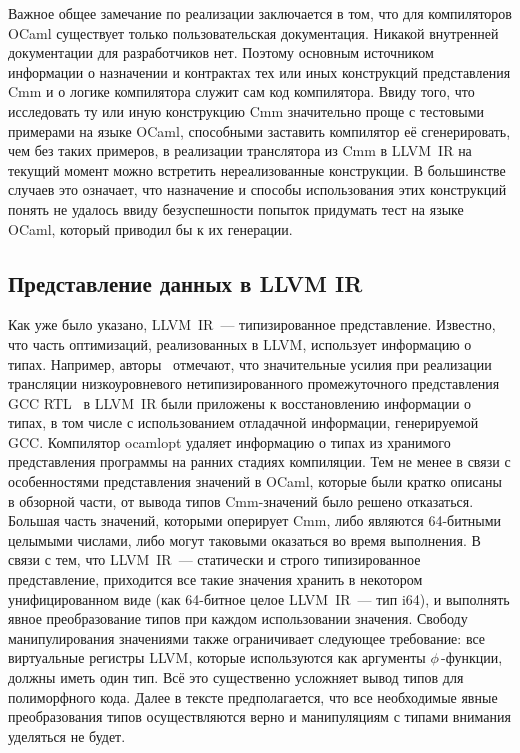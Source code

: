 \documentclass[a4paper, 12pt]{article}
\begin{document}
Важное общее замечание по реализации заключается в том, что для компиляторов OCaml существует только пользовательская
документация. Никакой внутренней документации для разработчиков нет. Поэтому основным источником информации о
назначении и контрактах тех или иных конструкций представления Cmm и о логике компилятора служит сам код компилятора.
Ввиду того, что исследовать ту или иную конструкцию Cmm значительно проще с тестовыми примерами на языке OCaml,
способными заставить компилятор её сгенерировать, чем без таких примеров, в реализации транслятора из Cmm
в LLVM~IR на текущий момент можно встретить нереализованные конструкции. В большинстве случаев это означает, что
назначение и способы использования этих конструкций понять не удалось ввиду безуспешности попыток придумать тест на
языке OCaml, который приводил бы к их генерации.

\subsection{Представление данных в LLVM IR}
Как уже было указано, LLVM~IR~--- типизированное представление. Известно, что часть оптимизаций, реализованных в LLVM,
использует информацию о типах. Например, авторы~\cite{LLVM} отмечают, что значительные усилия при реализации
трансляции низкоуровневого нетипизированного промежуточного представления GCC RTL~\cite{GCCints} в LLVM~IR были
приложены к восстановлению информации о
типах, в том числе с использованием отладачной информации, генерируемой GCC. Компилятор ocamlopt удаляет информацию о
типах из хранимого представления программы на ранних стадиях компиляции. Тем не менее в связи с особенностями
представления значений в OCaml, которые были кратко описаны в обзорной части, от вывода типов Cmm-значений было решено
отказаться. Большая часть значений, которыми оперирует Cmm, либо являются 64-битными целымыми числами, либо могут
таковыми оказаться во время выполнения. В связи с тем, что LLVM~IR~--- статически и строго типизированное представление,
приходится все такие значения хранить в некотором унифицированном виде (как 64-битное целое LLVM~IR~--- тип i64), и
выполнять явное преобразование типов при каждом использовании значения. Свободу манипулирования значениями также
ограничивает следующее требование: все виртуальные регистры LLVM, которые используются как аргументы $\phi\,$-функции,
должны иметь один тип. Всё это существенно усложняет вывод типов для полиморфного кода. Далее в тексте предполагается,
что все необходимые явные преобразования типов осуществляются верно и манипуляциям с типами внимания уделяться не будет.
\end{document}
